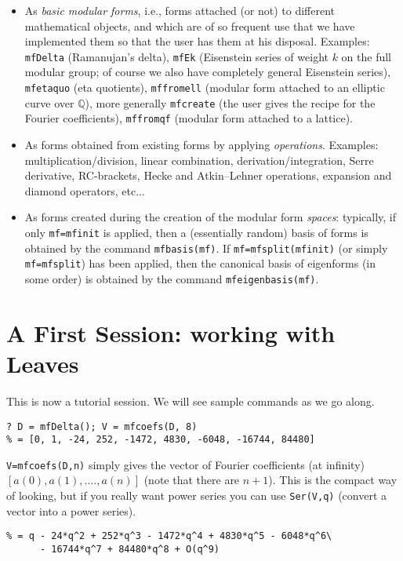 \documentclass[11pt]{article}
\newcommand{\Q}{{\mathbb Q}}
\def\kbd#1{{\tt #1}}
\begin{document}
\begin{itemize}\item As \emph{basic modular forms}, i.e., forms attached (or
  not) to different mathematical objects, and which are of so frequent use
  that we have implemented them so that the user has them at his disposal.
  Examples: \kbd{mfDelta} (Ramanujan's delta), \kbd{mfEk}
  (Eisenstein series of weight $k$ on the full modular group; of course
  we also have completely general Eisenstein series), \kbd{mfetaquo}
  (eta quotients), \kbd{mffromell} (modular form attached to an elliptic
  curve over $\Q$), more generally \kbd{mfcreate} (the user gives the
  recipe for the Fourier coefficients), \kbd{mffromqf} (modular form attached
  to a lattice).
\item As forms obtained from existing forms by applying \emph{operations}.
  Examples: multiplication/division, linear combination,
  derivation/integration, Serre derivative, RC-brackets, Hecke and
  Atkin--Lehner operations, expansion and diamond operators, etc...
\item As forms created during the creation of the modular form \emph{spaces}:
  typically, if only \kbd{mf=mfinit} is applied, then a (essentially random)
  basis of forms is obtained by the command \kbd{mfbasis(mf)}. If
  \kbd{mf=mfsplit(mfinit)} (or simply \kbd{mf=mfsplit}) has been applied,
  then the canonical basis of eigenforms (in some order) is obtained by the
  command \kbd{mfeigenbasis(mf)}.\end{itemize}

\section{A First Session: working with Leaves}

This is now a tutorial session. We will see sample commands as we go along.

\begin{verbatim}
? D = mfDelta(); V = mfcoefs(D, 8)
% = [0, 1, -24, 252, -1472, 4830, -6048, -16744, 84480]
\end{verbatim}

\kbd{V=mfcoefs(D,n)} simply gives the vector of Fourier coefficients (at
infinity) $[a(0),a(1),....,a(n)]$ (note that there are $n+1$). This is the
compact way of looking, but if you really want power series you can
use \kbd{Ser(V,q)} (convert a vector into a power series).

\begin{verbatim}
% = q - 24*q^2 + 252*q^3 - 1472*q^4 + 4830*q^5 - 6048*q^6\
      - 16744*q^7 + 84480*q^8 + O(q^9)
\end{verbatim}
\end{document}
